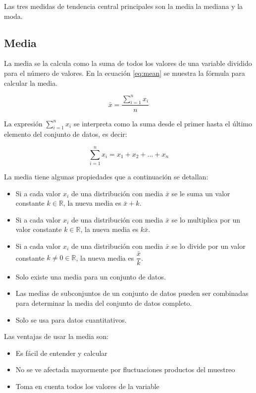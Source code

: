 \documentclass[letterpaper,]{book}
\providecommand{\tightlist}{%
  \setlength{\itemsep}{0pt}\setlength{\parskip}{0pt}}
\begin{document}
Las tres medidas de tendencia central principales son la media la mediana y la moda.

\hypertarget{media}{%
\subsection{Media}\label{media}}

La media se la calcula como la suma de todos los valores de una variable dividido para el número de valores. En la ecuación \eqref{eq:mean} se muestra la fórmula para calcular la media.

\begin{equation} 
  \bar{x} = \dfrac{\sum_{i=1}^{n}x_i}{n}
  \label{eq:mean}
\end{equation}

La expresión \(\sum_{i=1}^{n} x_i\) se interpreta como la suma desde el primer hasta el último elemento del conjunto de datos, es decir:

\begin{equation} 
  \sum_{i=1}^{n} x_i = x_1 + x_2 + \ldots + x_n 
  \label{eq:sum}
\end{equation}

La media tiene algunas propiedades que a continuación se detallan:

\begin{itemize}
\tightlist
\item
  Si a cada valor \(x_i\) de una distribución con media \(\bar{x}\) se le suma un valor constante \(k \in \mathbb{R}\), la nueva media es \(\bar{x}+k\).
\item
  Si a cada valor \(x_i\) de una distribución con media \(\bar{x}\) se lo multiplica por un valor constante \(k \in \mathbb{R}\), la nueva media es \(k\bar{x}\).
\item
  Si a cada valor \(x_i\) de una distribución con media \(\bar{x}\) se lo divide por un valor constante \(k \neq 0 \in \mathbb{R}\), la nueva media es \(\dfrac{\bar{x}}{k}\).
\item
  Solo existe una media para un conjunto de datos.
\item
  Las medias de subconjuntos de un conjunto de datos pueden ser combinadas para determinar la media del conjunto de datos completo.
\item
  Solo se usa para datos cuantitativos.
\end{itemize}

Las ventajas de usar la media son:

\begin{itemize}
\tightlist
\item
  Es fácil de entender y calcular
\item
  No se ve afectada mayormente por fluctuaciones productos del muestreo
\item
  Toma en cuenta todos los valores de la variable
\end{itemize}
\end{document}
